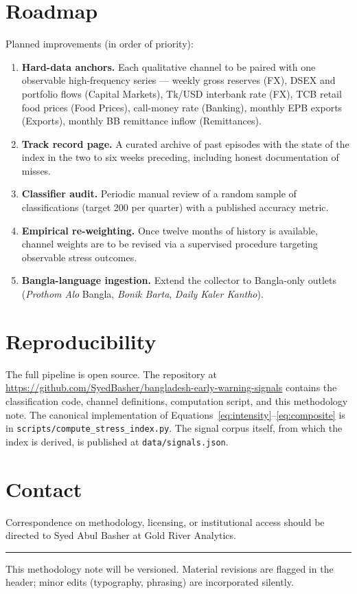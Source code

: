 \documentclass[11pt, a4paper]{article}
\begin{document}
\section{Roadmap}

Planned improvements (in order of priority):
\begin{enumerate}[leftmargin=2em, topsep=0.2em, itemsep=0.3em]
  \item \textbf{Hard-data anchors.} Each qualitative channel to be
        paired with one observable high-frequency series --- weekly
        gross reserves (FX), DSEX and portfolio flows (Capital
        Markets), Tk/USD interbank rate (FX), TCB retail food prices
        (Food Prices), call-money rate (Banking), monthly EPB exports
        (Exports), monthly BB remittance inflow (Remittances).
  \item \textbf{Track record page.} A curated archive of past episodes
        with the state of the index in the two to six weeks
        preceding, including honest documentation of misses.
  \item \textbf{Classifier audit.} Periodic manual review of a random
        sample of classifications (target 200 per quarter) with a
        published accuracy metric.
  \item \textbf{Empirical re-weighting.} Once twelve months of history
        is available, channel weights are to be revised via a
        supervised procedure targeting observable stress outcomes.
  \item \textbf{Bangla-language ingestion.} Extend the collector to
        Bangla-only outlets (\textit{Prothom Alo} Bangla,
        \textit{Bonik Barta}, \textit{Daily Kaler Kantho}).
\end{enumerate}

\section{Reproducibility}

The full pipeline is open source. The repository at
\url{https://github.com/SyedBasher/bangladesh-early-warning-signals}
contains the classification code, channel definitions, computation
script, and this methodology note. The canonical implementation of
Equations~\eqref{eq:intensity}--\eqref{eq:composite} is in
\texttt{scripts/compute\_stress\_index.py}. The signal corpus itself,
from which the index is derived, is published at
\texttt{data/signals.json}.

\section*{Contact}

Correspondence on methodology, licensing, or institutional access
should be directed to Syed Abul Basher at Gold River Analytics.

\vspace{1em}
\hrule
\vspace{0.5em}
\begin{center}
\footnotesize
This methodology note will be versioned. Material revisions are
flagged in the header; minor edits (typography, phrasing) are
incorporated silently.
\end{center}
\end{document}
